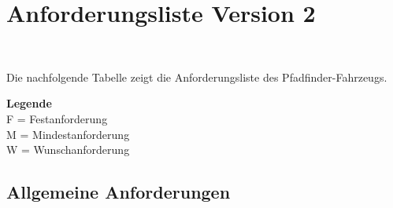 \documentclass[main.tex]{subfiles} %
\begin{document}

\section{Anforderungsliste Version 2}~\label{appendix:Greifereinheit}

Die nachfolgende Tabelle zeigt die Anforderungsliste des Pfadfinder-Fahrzeugs.

\textbf{Legende} \\ F = Festanforderung \\ M = Mindestanforderung \\ W = Wunschanforderung

\subsection{Allgemeine Anforderungen}
\end{document}
